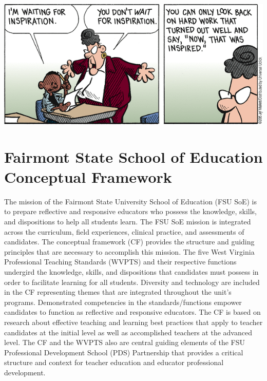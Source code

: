 \documentclass{tufte-handout}
\begin{document}
\begin{marginfigure}%
	\begin{center}
		\includegraphics[width=1\linewidth]{frazz-inspiration.png}
	\end{center}
\end{marginfigure}

\section{Fairmont State School of Education Conceptual Framework}
The mission of the Fairmont State University School of Education (FSU SoE) is to prepare reflective and responsive educators who possess the knowledge, skills, and dispositions to help all students learn. The FSU SoE mission is integrated across the curriculum, field experiences, clinical practice, and assessments of candidates. The conceptual framework (CF) provides the structure and guiding principles that are necessary to accomplish this mission. The five West Virginia Professional Teaching Standards (WVPTS) and their respective functions undergird the knowledge, skills, and dispositions that candidates must possess in order to facilitate learning for all students. Diversity and technology are included in the CF representing themes that are integrated throughout the unit's programs. Demonstrated competencies in the standards/functions empower candidates to function as reflective and responsive educators. The CF is based on research about effective teaching and learning best practices that apply to teacher candidates at the initial level as well as accomplished teachers at the advanced level. The CF and the WVPTS also are central guiding elements of the FSU Professional Development School (PDS) Partnership that provides a critical structure and context for teacher education and educator professional development.
\end{document}
